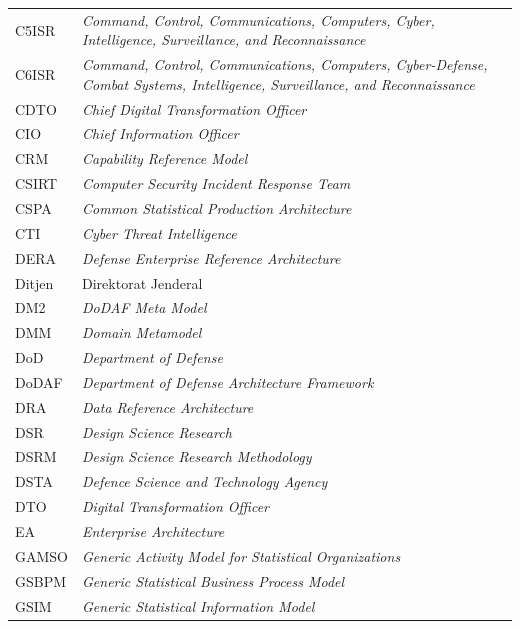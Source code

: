\begin{longtable}{@{} l >{\raggedright\arraybackslash}p{7.2cm} c @{}}
C5ISR & \textit{Command, Control, Communications, Computers, Cyber, Intelligence, Surveillance, and Reconnaissance} & \pageref{sk:C5ISR} \\
C6ISR & \textit{Command, Control, Communications, Computers, Cyber-Defense, Combat Systems, Intelligence, Surveillance, and Reconnaissance} & \pageref{sk:C6ISR} \\
CDTO & \textit{Chief Digital Transformation Officer} & \pageref{sk:CDTO} \\
CIO & \textit{Chief Information Officer} & \pageref{sk:CIO} \\
CRM & \textit{Capability Reference Model} & \pageref{sk:CRM} \\
CSIRT & \textit{Computer Security Incident Response Team} & \pageref{sk:CSIRT} \\
CSPA & \textit{Common Statistical Production Architecture} & \pageref{sk:CSPA} \\
CTI & \textit{Cyber Threat Intelligence} & \pageref{sk:CTI} \\
DERA & \textit{Defense Enterprise Reference Architecture} & \pageref{sk:DERA} \\
Ditjen & Direktorat Jenderal & \pageref{sk:Ditjen} \\
DM2 & \textit{DoDAF Meta Model} & \pageref{sk:DM2} \\
DMM & \textit{Domain Metamodel} & \pageref{sk:DMM} \\
DoD & \textit{Department of Defense} & \pageref{sk:DoD} \\
DoDAF & \textit{Department of Defense Architecture Framework} & \pageref{sk:DoDAF} \\
DRA & \textit{Data Reference Architecture} & \pageref{sk:DRA} \\
DSR & \textit{Design Science Research} & \pageref{sk:DSR} \\
DSRM & \textit{Design Science Research Methodology} & \pageref{sk:DSRM} \\
DSTA & \textit{Defence Science and Technology Agency} & \pageref{sk:DSTA} \\
DTO & \textit{Digital Transformation Officer} & \pageref{sk:DTO} \\
EA & \textit{Enterprise Architecture} & \pageref{sk:EA} \\
GAMSO & \textit{Generic Activity Model for Statistical Organizations} & \pageref{sk:GAMSO} \\
GSBPM & \textit{Generic Statistical Business Process Model} & \pageref{sk:GSBPM} \\
GSIM & \textit{Generic Statistical Information Model} & \pageref{sk:GSIM} \\

\end{longtable}
